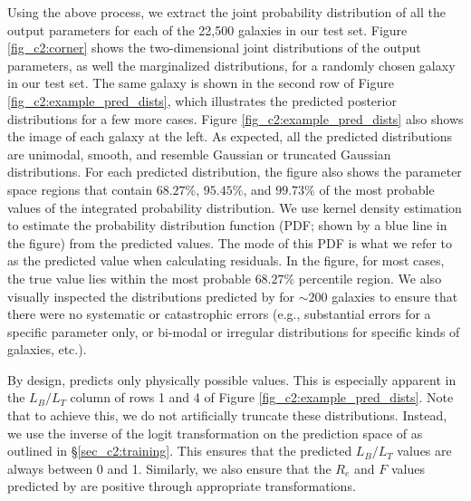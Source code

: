 Using the above process, we extract the joint probability distribution of all the output parameters for each of the 22,500 galaxies in our test set. Figure \ref{fig_c2:corner} shows the two-dimensional joint distributions of the output parameters, as well the marginalized distributions, for a randomly chosen galaxy in our test set. 
The same galaxy %
is shown in the second row of Figure \ref{fig_c2:example_pred_dists},
which illustrates the predicted posterior distributions for a few more cases.
Figure \ref{fig_c2:example_pred_dists} also shows the image of each galaxy %
at the left.
As expected, all the predicted distributions are unimodal, smooth, and resemble Gaussian or truncated Gaussian distributions. For each predicted distribution, the figure also shows the parameter space regions that contain $68.27\%$, $95.45\%$, and $99.73\%$ of the most probable values of the integrated probability distribution. We use kernel density estimation to estimate the probability distribution function (PDF; shown by a blue line in the figure) from the predicted values. The mode of this PDF is what we refer to as the predicted value when calculating residuals. In the figure, for most cases, the true value lies within the most probable $68.27\%$ percentile region. We also visually inspected the distributions predicted by \gampen{} for $\sim200$ galaxies to ensure that there were no systematic or catastrophic errors (e.g., substantial errors for a specific parameter only, or bi-modal or irregular distributions for specific kinds of galaxies, etc.). 

By design, \gampen{} predicts only physically possible values. This is especially apparent in the $L_B/L_T$ column of rows 1 and 4 of Figure \ref{fig_c2:example_pred_dists}. Note that to achieve this, we do not artificially truncate these distributions. Instead, we use the inverse of the logit transformation on the prediction space of \gampen{} as outlined in \S \ref{sec_c2:training}. This ensures that the predicted $L_B/L_T$ values are always between 0 and 1. Similarly, we also ensure  that the $R_e$ and $F$ values predicted by \gampen{} are positive through appropriate transformations. 


